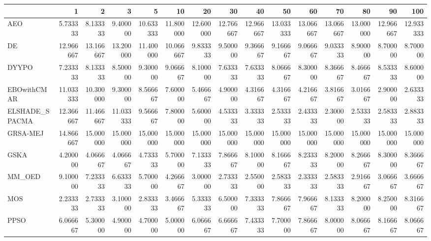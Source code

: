 \begin{tabular}{lrrrrrrrrrrrrrr}
\toprule
{} &        1   &        2   &        3   &        5   &        10  &        20  &        30  &        40  &        50  &        60  &        70  &        80  &        90  &        100 \\
\midrule
AEO            &   5.733333 &   8.133333 &   9.400000 &  10.633333 &  11.800000 &  12.600000 &  12.766667 &  12.966667 &  13.033333 &  13.066667 &  13.066667 &  13.000000 &  12.966667 &  12.933333 \\
DE             &  12.966667 &  13.166667 &  13.200000 &  11.400000 &  10.066667 &   9.833333 &   9.500000 &   9.366667 &   9.166667 &   9.066667 &   9.033333 &   8.900000 &   8.700000 &   8.700000 \\
DYYPO          &   7.233333 &   8.133333 &   8.500000 &   9.300000 &   9.066667 &   8.100000 &   7.633333 &   7.633333 &   8.066667 &   8.300000 &   8.366667 &   8.466667 &   8.533333 &   8.600000 \\
EBOwithCMAR    &  11.033333 &  10.300000 &   9.300000 &   8.566667 &   7.600000 &   5.466667 &   4.900000 &   4.316667 &   4.316667 &   4.216667 &   3.816667 &   3.016667 &   2.900000 &   2.633333 \\
ELSHADE\_SPACMA &  12.366667 &  11.466667 &  11.033333 &   9.566667 &   7.800000 &   5.600000 &   4.533333 &   3.333333 &   2.533333 &   2.433333 &   2.300000 &   2.533333 &   2.583333 &   2.883333 \\
GRSA-MEJ       &  14.866667 &  15.000000 &  15.000000 &  15.000000 &  15.000000 &  15.000000 &  15.000000 &  15.000000 &  15.000000 &  15.000000 &  15.000000 &  15.000000 &  15.000000 &  15.000000 \\
GSKA           &   4.200000 &   4.066667 &   4.066667 &   4.733333 &   5.700000 &   7.133333 &   7.866667 &   8.100000 &   8.166667 &   8.233333 &   8.200000 &   8.266667 &   8.300000 &   8.366667 \\
MM\_OED         &   9.100000 &   7.233333 &   6.633333 &   5.700000 &   4.266667 &   3.000000 &   2.733333 &   2.550000 &   2.583333 &   2.333333 &   2.583333 &   2.916667 &   3.066667 &   3.666667 \\
MOS            &   2.233333 &   2.733333 &   3.100000 &   2.833333 &   3.466667 &   5.333333 &   6.500000 &   7.333333 &   7.866667 &   7.966667 &   8.133333 &   8.200000 &   8.250000 &   8.316667 \\
PPSO           &   6.066667 &   5.300000 &   4.900000 &   4.700000 &   5.000000 &   6.066667 &   6.666667 &   7.433333 &   7.700000 &   7.866667 &   8.000000 &   8.066667 &   8.166667 &   8.066667 \\

\end{tabular}

